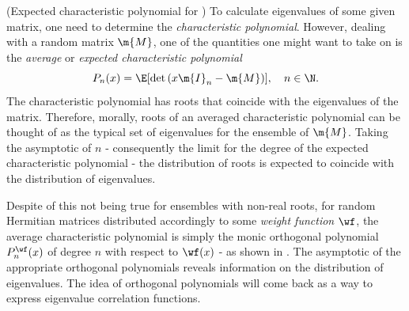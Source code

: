 \begin{observacao}	\label{Example: Hermite-GUE} (Expected characteristic polynomial for ) 
	To calculate eigenvalues of some given matrix, one need to determine the \textit{characteristic polynomial}. However, dealing with a random matrix $\m{M}$, one of the quantities one might want to take on is the \textit{average} or \textit{expected characteristic polynomial} 
	\begin{equation}
		P_n(x) = \E[ \det\left(x \m{I}_n - \m{M}\right)], \quad n \in \N.
	\end{equation}
	The characteristic polynomial has roots that coincide with the eigenvalues of the matrix. Therefore, morally, roots of an averaged characteristic polynomial can be thought of as the typical set of eigenvalues for the ensemble of $\m{M}$. Taking the asymptotic of $n$ - consequently the limit for the degree of the expected characteristic polynomial - the distribution of roots is expected to coincide with the distribution of eigenvalues. 
	
	Despite of this not being true for ensembles with non-real roots, for random Hermitian matrices distributed accordingly to some \textit{weight function} $\wf$, the average characteristic polynomial is simply the monic orthogonal polynomial $P_n^\wf(x)$ of degree $n$ with respect to $\wf(x)$ - as shown in  .  The asymptotic of the appropriate orthogonal polynomials reveals information on the distribution of eigenvalues. The idea of orthogonal polynomials will come back as a way to express eigenvalue correlation functions.
	

\end{observacao}

